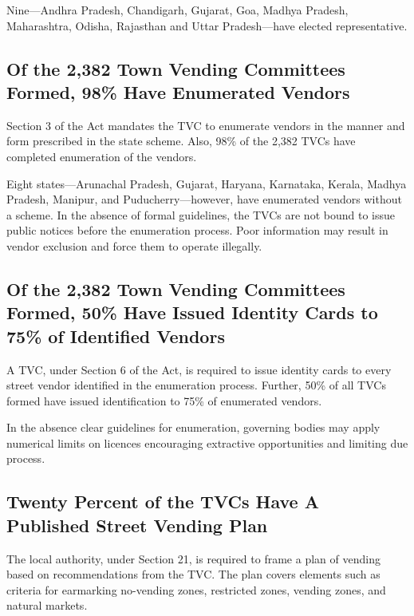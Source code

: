 \documentclass[a4paper, 12pt, twoside]{article}
\begin{document}
	Nine—Andhra Pradesh, Chandigarh, Gujarat, Goa, Madhya Pradesh, Maharashtra, Odisha, Rajasthan and Uttar Pradesh—have elected representative.

\subsection*{Of the 2,382 Town Vending Committees Formed, 98\% Have Enumerated Vendors}
	Section 3 of the Act mandates the TVC to enumerate vendors in the manner and form prescribed in the state scheme. Also, 98\% of the 2,382 TVCs have completed enumeration of the vendors.

	Eight states—Arunachal Pradesh, Gujarat, Haryana, Karnataka, Kerala, Madhya Pradesh, Manipur, and Puducherry—however, have enumerated vendors without a scheme. In the absence of formal guidelines, the TVCs are not bound to issue public notices before the enumeration process. Poor information may result in vendor exclusion and force them to operate illegally.

\subsection*{Of the 2,382 Town Vending Committees Formed, 50\% Have Issued Identity Cards to 75\% of Identified Vendors}

	A TVC, under Section 6 of the Act, is required to issue identity cards to every street vendor identified in the enumeration process.  Further, 50\% of all TVCs formed have issued identification to 75\% of enumerated vendors.


	In the absence clear guidelines for enumeration, governing bodies may apply numerical limits on licences encouraging extractive opportunities and limiting due process.

\subsection*{Twenty Percent of the TVCs Have A Published Street Vending Plan}
	The local authority, under Section 21, is required to frame a plan of vending based on recommendations from the TVC. The plan covers elements such as criteria for earmarking no-vending zones, restricted zones, vending zones, and natural markets.
\end{document}
